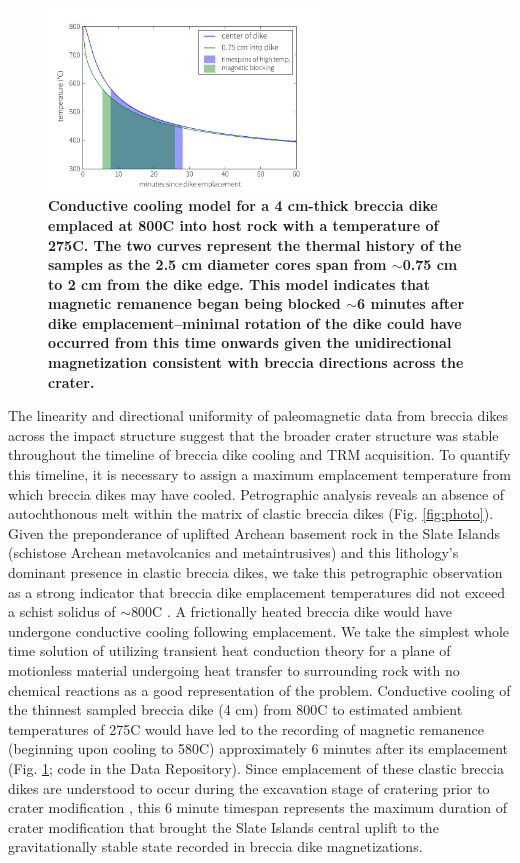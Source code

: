 \documentclass[11pt,letterpaper]{article}
\begin{document}
\begin{figure}
\noindent\includegraphics[width=0.65\textwidth]{figures/Cooling.pdf}
\caption{\textbf{\footnotesize{Conductive cooling model for a 4 cm-thick breccia dike emplaced at 800\textdegree C into host rock with a temperature of 275\textdegree C. The two curves represent the thermal history of the samples as the 2.5 cm diameter cores span from $\sim$0.75 cm to 2 cm from the dike edge. This model indicates that magnetic remanence began being blocked $\sim$6 minutes after dike emplacement--minimal rotation of the dike could have occurred from this time onwards given the unidirectional magnetization consistent with breccia directions across the crater.}}}
\label{fig:cooling}
\end{figure}

The linearity and directional uniformity of paleomagnetic data from breccia dikes across the impact structure suggest that the broader crater structure was stable throughout the timeline of breccia dike cooling and TRM acquisition. To quantify this timeline, it is necessary to assign a maximum emplacement temperature from which breccia dikes may have cooled. Petrographic analysis reveals an absence of autochthonous melt within the matrix of clastic breccia dikes (Fig. \ref{fig:photo}). Given the preponderance of uplifted Archean basement rock in the Slate Islands (schistose Archean metavolcanics and metaintrusives) and this lithology's dominant presence in clastic breccia dikes, we take this petrographic observation as a strong indicator that breccia dike emplacement temperatures did not exceed a schist solidus of $\sim$800\textdegree C \citep{Douce1998a, Whittington2009a}. A frictionally heated breccia dike would have undergone conductive cooling following emplacement. We take the simplest whole time solution of \cite{Delaney1987a} utilizing transient heat conduction theory for a plane of motionless material undergoing heat transfer to surrounding rock with no chemical reactions as a good representation of the problem. Conductive cooling of the thinnest sampled breccia dike (4 cm) from 800\textdegree C to estimated ambient temperatures of 275\textdegree C would have led to the recording of magnetic remanence (beginning upon cooling to 580\textdegree C) approximately 6 minutes after its emplacement (Fig. \ref{fig:cooling}; code in the Data Repository). Since emplacement of these clastic breccia dikes are understood to occur during the excavation stage of cratering prior to crater modification \citep{Lambert1981a, Masaitis2005a}, this 6 minute timespan represents the maximum duration of crater modification  that brought the Slate Islands central uplift to the gravitationally stable state recorded in breccia dike magnetizations.
\end{document}
